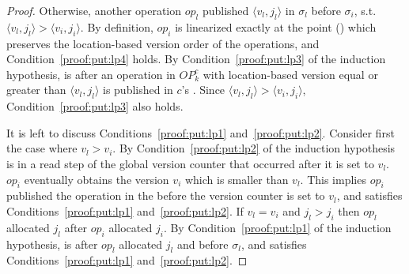 \begin{proof}
Otherwise, another operation $op_l$ published $\langle v_l, j_l\rangle$ in $\sigma_l$ before $\sigma_i$, s.t. $\langle v_l, j_l\rangle > \langle v_i, j_i\rangle$. By definition, $op_i$ is linearized exactly at the point () which preserves the location-based version order of the operations, and Condition~\ref{proof:put:lp4} holds. By Condition~\ref{proof:put:lp3} of the induction hypothesis,  is after an operation in $OP_k^c$ with location-based version equal or greater than $\langle v_l, j_l\rangle$ is published in $c$'s . Since $\langle v_l, j_l\rangle > \langle v_i, j_i\rangle$, Condition~\ref{proof:put:lp3} also holds.

It is left to discuss Conditions~\ref{proof:put:lp1} and~\ref{proof:put:lp2}. Consider first the case where $v_l>v_i$. By Condition~\ref{proof:put:lp2} of the induction hypothesis  is in a read step of the global version counter that occurred after it is set to $v_l$. $op_i$ eventually obtains the version $v_i$ which is smaller than $v_l$. This implies $op_i$ published the operation in the  before the version counter is set to $v_l$, and   satisfies Conditions~\ref{proof:put:lp1} and~\ref{proof:put:lp2}. If $v_l =v_i$ and $j_l>j_i$ then $op_l$ allocated $j_l$ after $op_i$ allocated $j_i$. By Condition~\ref{proof:put:lp1} of the induction hypothesis,  is after $op_l$ allocated $j_l$  and before $\sigma_l$, and   satisfies Conditions~\ref{proof:put:lp1} and~\ref{proof:put:lp2}.
\end{proof}

